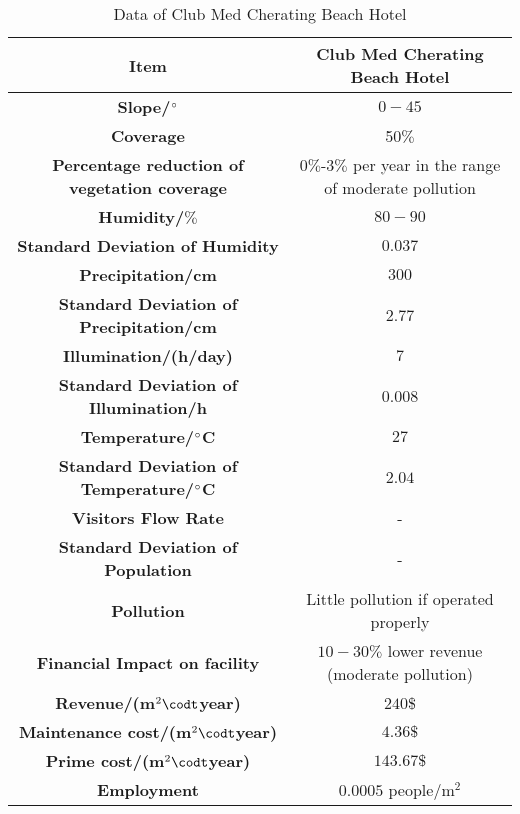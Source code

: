 \documentclass[./main.tex]{subfiles}
\begin{document}
    \begin{table}[H]
        \caption{Data of Club Med Cherating Beach Hotel}
        \centering
        \begin{tabular}{c c}
        \toprule
        \textbf{Item} & \textbf{Club Med Cherating Beach Hotel} \\[0.25cm]
        \midrule
        \textbf{Slope/$\degree$} & $0-45$ \\[0.25cm]
        \textbf{Coverage} & 50$\%$ \\[0.25cm]
        \textbf{Percentage reduction of vegetation coverage} & 0$\%$-3$\%$  per year in the range of moderate pollution \\[0.25cm]
        \textbf{Humidity/$\%$} & $80-90$ \\[0.25cm]
        \textbf{Standard Deviation of Humidity} & $0.037$ \\[0.25cm]
        \textbf{Precipitation/cm} & $300$ \\[0.25cm]
        \textbf{Standard Deviation of Precipitation/cm} & $2.77$ \\[0.25cm]
        \textbf{Illumination/(h/day)} & $7$ \\[0.25cm]
        \textbf{Standard Deviation of Illumination/h} & $0.008$ \\[0.25cm]
        \textbf{Temperature/$\degree$C} & $27$ \\[0.25cm]
        \textbf{Standard Deviation of Temperature/$\degree$C} & $2.04$ \\[0.25cm]
        \textbf{Visitors Flow Rate} & - \\[0.25cm]
        \textbf{Standard Deviation of Population} & - \\[0.25cm]
        \textbf{Pollution} & Little pollution if operated properly \\[0.25cm]
        \textbf{Financial Impact on facility} & $10-30\%$ lower revenue (moderate pollution) \\[0.25cm]
        \textbf{Revenue/(m$^2 \codt$year)} & $240$\$ \\[0.25cm]
        \textbf{Maintenance cost/(m$^2 \codt$year)} & $4.36\$$ \\[0.25cm]
        \textbf{Prime cost/(m$^2 \codt$year)} & $143.67\$$ \\[0.25cm]
        \textbf{Employment} & $0.0005$ people/m$^2$ \\[0.25cm]
        \bottomrule
        \end{tabular}
    \end{table}
\end{document}
